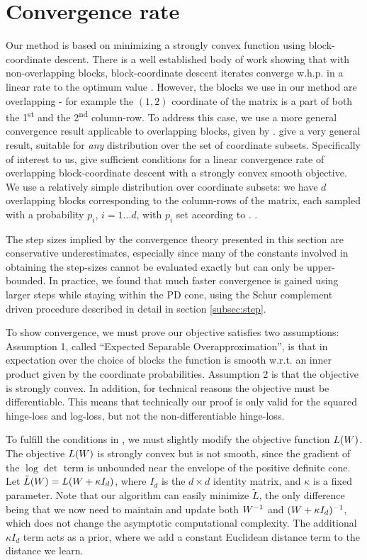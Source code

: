 \documentclass{article}
\begin{document}
\section{Convergence rate}
Our method is based on minimizing a strongly convex function using block-coordinate descent. There is a well established body of work showing that with non-overlapping blocks, block-coordinate descent iterates converge w.h.p. in a linear rate to the optimum value \cite{nesterov2012efficiency,richtarik2014iteration}.
However, the blocks we use in our method are overlapping - for example the $(1,2)$ coordinate of the matrix is a part of both the 1\textsuperscript{st} and the 2\textsuperscript{nd} column-row. To address this case, we use a more general convergence result applicable to overlapping blocks, given by \citet{richtarik2013optimal}. \citeauthor{richtarik2013optimal} give a very general result, suitable for \emph{any} distribution over the set of coordinate subsets. 
Specifically of interest to us, \citeauthor{richtarik2013optimal} give sufficient conditions for a linear convergence rate of overlapping block-coordinate descent with a strongly convex smooth objective. 
We use a relatively simple distribution over coordinate subsets: we have $d$ overlapping blocks corresponding to the column-rows of the matrix, each sampled with a probability $p_i$, $i=1 \ldots d$, with $p_i$ set according to .
.

The step sizes implied by the convergence theory presented in this section are conservative underestimates, especially since many of the constants involved in obtaining the step-sizes cannot be evaluated exactly but can only be upper-bounded. In practice, we found that much faster convergence is gained using larger steps while staying within the PD cone, using the Schur complement driven procedure described in detail in section \ref{subsec:step}.

To show convergence, we must prove our objective satisfies two assumptions: Assumption 1, called ``Expected Separable Overapproximation'', is that in expectation over the choice of blocks the function is smooth w.r.t. an inner product given by the coordinate probabilities. Assumption 2 is that the objective is strongly convex. In addition, for technical reasons the objective must be differentiable. This means that technically our proof is only valid for the squared hinge-loss and log-loss, but not the non-differentiable hinge-loss.

To fulfill the conditions in \cite{richtarik2013optimal}, we must slightly modify the objective function $L({{W}})$. The objective $L({W})$ is strongly convex but is not smooth, since the gradient of the $\log \det$ term is unbounded near the envelope of the positive definite cone. Let $\tilde{L}({{W}}) = L({{W} + \kappa I_d})$, where $I_d$ is the $d \times d$ identity matrix, and $\kappa$ is a fixed parameter.
Note that our algorithm can easily minimize $\tilde{L}$, the only difference being that we now need to maintain and update both ${W}^{-1}$ and $({W}+\kappa I_d)^{-1}$, which does not change the asymptotic computational complexity. The additional $\kappa I_d$ term acts as a prior, where we add a constant Euclidean distance term to the distance we learn. 
\end{document}
